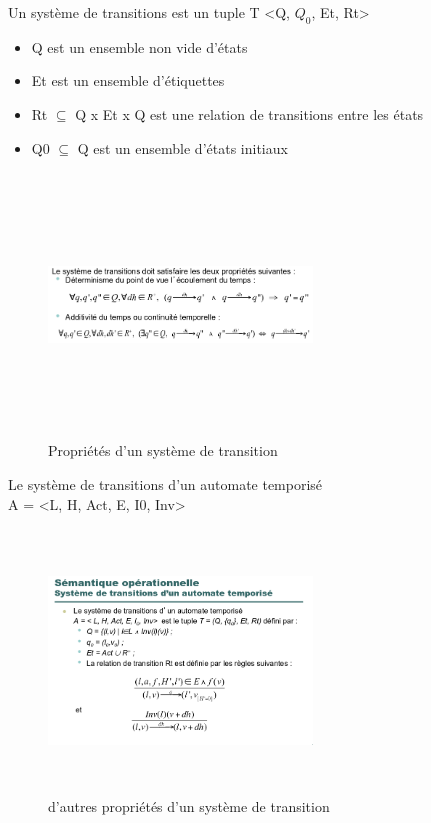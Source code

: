 \documentclass[oneside]{book}
\begin{document}
    Un système de transitions est un tuple T <Q, $Q_0$, Et, Rt>\\
    \begin{itemize}
        \item Q est un ensemble non vide d'états
        \item Et est un ensemble d'étiquettes
        \item Rt $\subseteq$ Q x Et x Q est une relation de transitions entre les états
        \item Q0 $\subseteq$ Q est un ensemble d'états initiaux
    \end{itemize}

    \begin{figure}[!ht]
    	\centering
    	\includegraphics[width = 7cm, height = 7cm, keepaspectratio]{Images/propriete_system_transition.png}
    	\caption{Propriétés d'un système de transition}
    	\label{fig:Systeme transition}
    \end{figure}
    
    Le système de transitions d'un automate temporisé\\
    
    A = <L, H, Act, E, I0, Inv>\\
    
    \begin{figure}[!ht]
    	\centering
    	\includegraphics[width = 7cm, height = 7cm, keepaspectratio]{Images/slide28.png}
    	\caption{d'autres propriétés d'un système de transition}
    	\label{fig:Systeme transition2}
    \end{figure}
    
\end{document}
